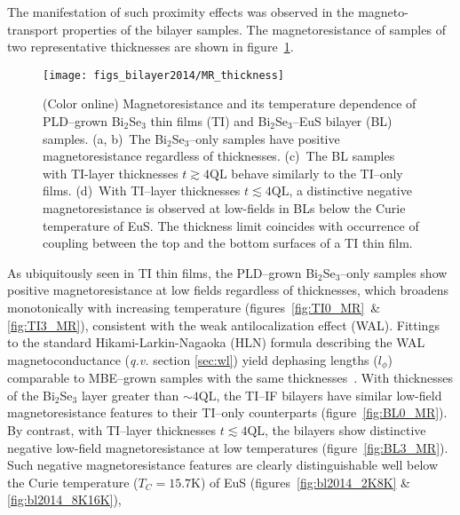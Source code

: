 The manifestation of such proximity effects was observed in the magneto-transport properties of the bilayer samples. The magnetoresistance of samples of two representative thicknesses are shown in figure~\ref{fig:bl2014_MR_thickness}.%
%
\begin{figure}[ht]%
\centering%
\subfloat{\label{fig:TI0_MR}}%
\subfloat{\label{fig:TI3_MR}}%
\subfloat{\label{fig:BL0_MR}}%
\subfloat{\label{fig:BL3_MR}}%
\texttt{[image: figs\_bilayer2014/MR\_thickness]}%
\caption[Magnetoresistance of various Bi$_2$Se$_3$ thin films and Bi$_2$Se$_3$--EuS bilayers]{\label{fig:bl2014_MR_thickness}(Color online) Magnetoresistance and its temperature dependence of PLD--grown Bi$_2$Se$_3$ thin films (TI) and Bi$_2$Se$_3$--EuS bilayer (BL) samples. (a, b)~The Bi$_2$Se$_3$--only samples have positive magnetoresistance regardless of thicknesses. (c)~The BL samples with TI-layer thicknesses $t\gtrsim4\mathrm{QL}$ behave similarly to the TI--only films. (d)~With TI--layer thicknesses $t\lesssim4\mathrm{QL}$, a distinctive negative magnetoresistance is observed at low-fields in BLs below the Curie temperature of EuS. The thickness limit coincides with occurrence of coupling between the top and the bottom surfaces of a TI thin film.}%
\end{figure} %
%
As ubiquitously seen in TI thin films, the PLD--grown Bi$_2$Se$_3$--only samples show positive magnetoresistance at low fields regardless of thicknesses, which broadens monotonically with increasing temperature (figures~\ref{fig:TI0_MR}~\& \ref{fig:TI3_MR}), consistent with the weak antilocalization effect (WAL). Fittings to the standard Hikami-Larkin-Nagaoka (HLN) formula describing the WAL magnetoconductance (\textit{q.v.} section \ref{sec:wl}) yield dephasing lengths ($l_\phi$) comparable to MBE--grown samples with the same thicknesses~\cite{TI_WAL_thickness, zhangli2013}. With thicknesses of the Bi$_2$Se$_3$ layer greater than $\sim4\mathrm{QL}$, the TI--IF bilayers have similar low-field magnetoresistance features to their TI--only counterparts (figure~\ref{fig:BL0_MR}). By contrast, with TI--layer thicknesses $t\lesssim4\mathrm{QL}$, the bilayers show distinctive negative low-field magnetoresistance at low temperatures (figure~\ref{fig:BL3_MR}). Such negative magnetoresistance features are clearly distinguishable well below the Curie temperature ($T_C=15.7$K) of EuS (figures~\ref{fig:bl2014_2K8K} \& \ref{fig:bl2014_8K16K}), %
%
%
